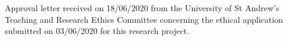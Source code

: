 Approval letter received on 18/06/2020 from the University of St Andrew's Teaching and Research Ethics Committee concerning the ethical application submitted on 03/06/2020 for this research project.

\clearpage

